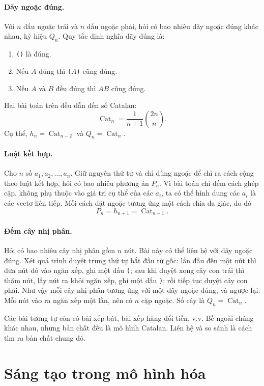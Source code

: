 \documentclass[11pt]{article}
\newcommand{\Cat}{\operatorname{Cat}}
\begin{document}
\paragraph{Dãy ngoặc đúng.}
Với \(n\) dấu ngoặc trái và \(n\) dấu ngoặc phải, hỏi có bao nhiêu dãy ngoặc
đúng khác nhau, ký hiệu \(Q_n\). Quy tắc định nghĩa dãy đúng là:
\begin{enumerate}
  \item \texttt{()} là đúng.
  \item Nếu \(A\) đúng thì \texttt{(}\(A\)\texttt{)} cũng đúng.
  \item Nếu \(A\) và \(B\) đều đúng thì \(AB\) cũng đúng.
\end{enumerate}

Hai bài toán trên đều dẫn đến số Catalan:
\[
  \Cat_n=\frac{1}{n+1}\binom{2n}{n}.
\]
Cụ thể, \(h_n=\Cat_{n-2}\) và \(Q_n=\Cat_n\).

\paragraph{Luật kết hợp.}
Cho \(n\) số \(a_1,a_2,\ldots,a_n\). Giữ nguyên thứ tự và chỉ dùng ngoặc để
chỉ ra cách cộng theo luật kết hợp, hỏi có bao nhiêu phương án \(P_n\). Vì bài
toán chỉ đếm cách ghép cặp, không phụ thuộc vào giá trị cụ thể của các
\(a_i\), ta có thể hình dung các \(a_i\) là các vectơ liên tiếp. Mỗi cách đặt
ngoặc tương ứng một cách chia đa giác, do đó
\[
  P_n=h_{n+1}=\Cat_{n-1}.
\]

\paragraph{Đếm cây nhị phân.}
Hỏi có bao nhiêu cây nhị phân gồm \(n\) nút. Bài này có thể liên hệ với dãy
ngoặc đúng. Xét quá trình duyệt trung thứ tự bắt đầu từ gốc: lần đầu đến một
nút thì đưa nút đó vào ngăn xếp, ghi một dấu \texttt{(}; sau khi duyệt xong
cây con trái thì thăm nút, lấy nút ra khỏi ngăn xếp, ghi một dấu \texttt{)};
rồi tiếp tục duyệt cây con phải. Như vậy mỗi cây nhị phân tương ứng với một
dãy ngoặc đúng, và ngược lại. Mỗi nút vào ra ngăn xếp một lần, nên có \(n\)
cặp ngoặc. Số cây là \(Q_n=\Cat_n\).

Các bài tương tự còn có bài xếp bát, bài xếp hàng đổi tiền, v.v. Bề ngoài
chúng khác nhau, nhưng bản chất đều là mô hình Catalan. Liên hệ và so sánh là
cách tìm ra bản chất chung đó.

\section{Sáng tạo trong mô hình hóa}
\end{document}
